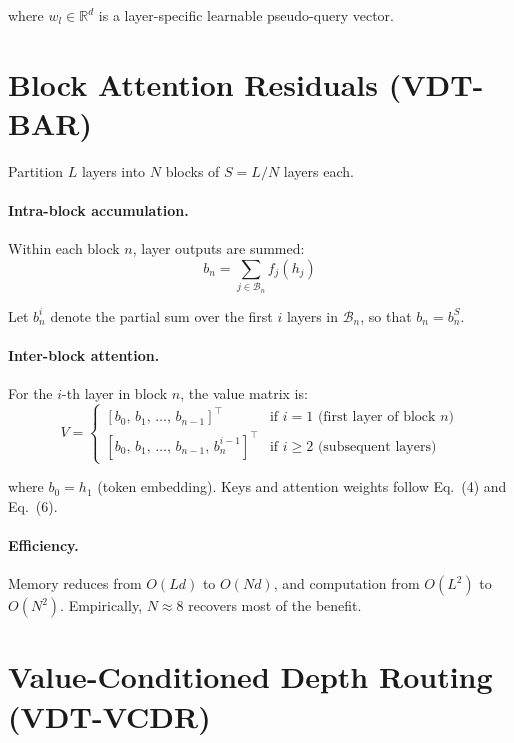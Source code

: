 \documentclass[11pt]{article}
\begin{document}
where $w_l \in \mathbb{R}^d$ is a layer-specific learnable pseudo-query vector.


\section{Block Attention Residuals (VDT-BAR)}

Partition $L$ layers into $N$ blocks of $S = L/N$ layers each.

\paragraph{Intra-block accumulation.}
Within each block $n$, layer outputs are summed:
\begin{equation}
    b_n = \sum_{j \in \mathcal{B}_n} f_j(h_j)
\end{equation}

Let $b_n^i$ denote the partial sum over the first $i$ layers in $\mathcal{B}_n$, so that $b_n = b_n^S$.

\paragraph{Inter-block attention.}
For the $i$-th layer in block $n$, the value matrix is:
\begin{equation}
    V =
    \begin{cases}
        [b_0,\, b_1,\, \ldots,\, b_{n-1}]^{\top}
            & \text{if } i = 1 \text{ (first layer of block $n$)} \\[6pt]
        [b_0,\, b_1,\, \ldots,\, b_{n-1},\, b_n^{i-1}]^{\top}
            & \text{if } i \ge 2 \text{ (subsequent layers)}
    \end{cases}
\end{equation}

where $b_0 = h_1$ (token embedding). Keys and attention weights follow Eq.~(4) and Eq.~(6).

\paragraph{Efficiency.}
Memory reduces from $O(Ld)$ to $O(Nd)$, and computation from $O(L^2)$ to $O(N^2)$.
Empirically, $N \approx 8$ recovers most of the benefit.


\section{Value-Conditioned Depth Routing (VDT-VCDR)}
\end{document}
